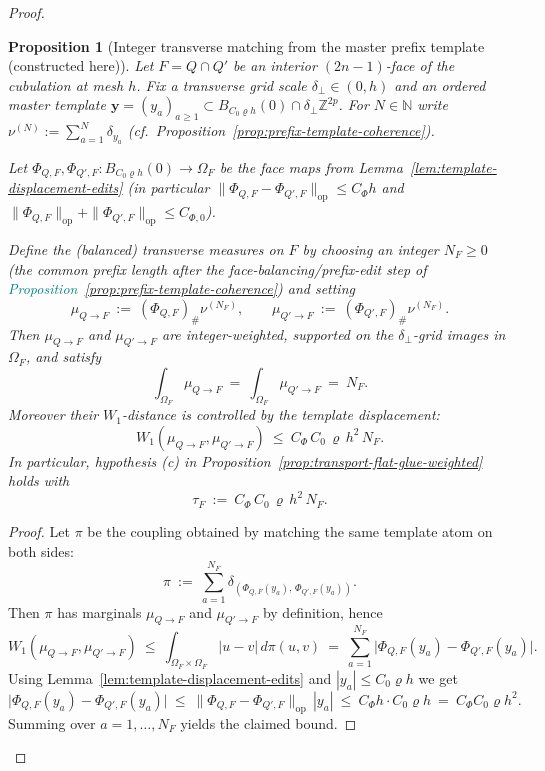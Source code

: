 \documentclass[11pt]{article}
\newcommand{\REVMZ}[1]{\textcolor{teal}{#1}}  %
\numberwithin{equation}{section}  %
\theoremstyle{plain}
\newtheorem{proposition}[theorem]{Proposition}
\theoremstyle{definition}
\theoremstyle{remark}
\begin{document}
\begin{proof}
\begin{proposition}[Integer transverse matching from the master prefix template (constructed here)]
\label{prop:integer-transport}
Let $F=Q\cap Q'$ be an interior $(2n-1)$-face of the cubulation at mesh $h$.
Fix a transverse grid scale $\delta_{\perp}\in(0,h)$ and an ordered master template
$\mathbf y=(y_a)_{a\ge1}\subset B_{C_0\varrho h}(0)\cap \delta_{\perp}\mathbb Z^{2p}$.
For $N\in\mathbb N$ write $\nu^{(N)}:=\sum_{a=1}^N\delta_{y_a}$ (cf.\ Proposition~\ref{prop:prefix-template-coherence}).

Let $\Phi_{Q,F},\Phi_{Q',F}:B_{C_0\varrho h}(0)\to \Omega_F$ be the face maps from
Lemma~\ref{lem:template-displacement-edits} (in particular
$\|\Phi_{Q,F}-\Phi_{Q',F}\|_{\mathrm{op}}\le C_\Phi h$ and
$\|\Phi_{Q,F}\|_{\mathrm{op}}+\|\Phi_{Q',F}\|_{\mathrm{op}}\le C_{\Phi,0}$).

Define the (balanced) transverse measures on $F$ by choosing an integer $N_F\ge0$
(the common prefix length after the face-balancing/prefix-edit step of
\REVMZ{Proposition~\ref{prop:prefix-template-coherence}}) and setting
\[
\mu_{Q\to F}\ :=\ (\Phi_{Q,F})_\#\nu^{(N_F)},
\qquad
\mu_{Q'\to F}\ :=\ (\Phi_{Q',F})_\#\nu^{(N_F)}.
\]
Then $\mu_{Q\to F}$ and $\mu_{Q'\to F}$ are integer-weighted, supported on the
$\delta_{\perp}$-grid images in $\Omega_F$, and satisfy
\[
\int_{\Omega_F}\mu_{Q\to F}\ =\ \int_{\Omega_F}\mu_{Q'\to F}\ =\ N_F.
\]
Moreover their $W_1$-distance is controlled by the template displacement:
\[
W_1(\mu_{Q\to F},\mu_{Q'\to F})
\ \le\ C_\Phi\,C_0\,\varrho\,h^2\,N_F.
\]
In particular, hypothesis \textnormal{(c)} in Proposition~\ref{prop:transport-flat-glue-weighted}
holds with
\[
\tau_F\ :=\ C_\Phi\,C_0\,\varrho\,h^2\,N_F.
\]
\end{proposition}

\begin{proof}
Let $\pi$ be the coupling obtained by matching the same template atom on both sides:
\[
\pi\ :=\ \sum_{a=1}^{N_F}\delta_{(\Phi_{Q,F}(y_a),\,\Phi_{Q',F}(y_a))}.
\]
Then $\pi$ has marginals $\mu_{Q\to F}$ and $\mu_{Q'\to F}$ by definition, hence
\[
W_1(\mu_{Q\to F},\mu_{Q'\to F})
\ \le\ \int_{\Omega_F\times\Omega_F}|u-v|\,d\pi(u,v)
\ =\ \sum_{a=1}^{N_F}\big|\Phi_{Q,F}(y_a)-\Phi_{Q',F}(y_a)\big|.
\]
Using Lemma~\ref{lem:template-displacement-edits} and $|y_a|\le C_0\varrho h$ we get
\[
\big|\Phi_{Q,F}(y_a)-\Phi_{Q',F}(y_a)\big|
\ \le\ \|\Phi_{Q,F}-\Phi_{Q',F}\|_{\mathrm{op}}\,|y_a|
\ \le\ C_\Phi h\cdot C_0\varrho h\ =\ C_\Phi C_0 \varrho h^2.
\]
Summing over $a=1,\dots,N_F$ yields the claimed bound.
\end{proof}






\end{proof}
\end{document}
